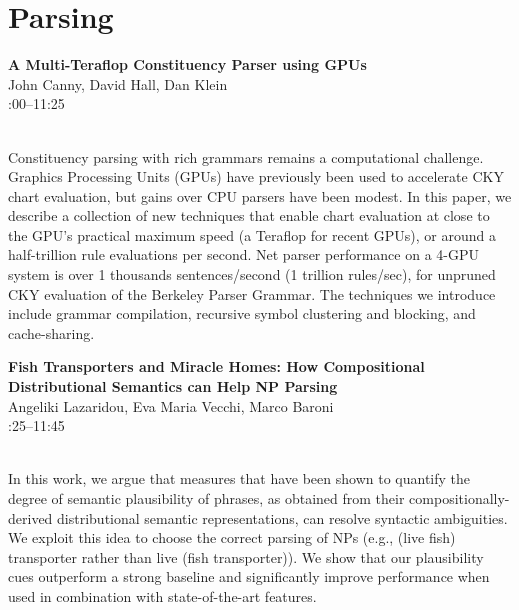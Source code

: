 \documentclass[twoside,makeidx]{book}
\renewcommand{\normalsize}{\fontsize{8}{9}\selectfont}
\renewcommand{\small}{\fontsize{7}{8}\selectfont}
\begin{document}
\section{Parsing}
\vspace{-1em}
\par\vspace{2em}\noindent%
\begin{minipage}{\linewidth}%
\begin{center}
\textbf{\normalsize A Multi-Teraflop Constituency Parser using GPUs}\\
\normalsize  John Canny,  David Hall,  Dan Klein\\
{\small 11:00--11:25}\\
\end{center}
\end{minipage}\\[0.5em]
\nopagebreak%
\noindent%
{\small Constituency parsing with rich grammars remains a computational challenge.  Graphics Processing Units (GPUs) have previously been used to accelerate CKY chart evaluation, but gains over CPU parsers have been modest. In this paper, we describe a collection of new techniques that enable chart evaluation at close to the GPU's practical maximum speed (a Teraflop for recent GPUs), or around a half-trillion rule evaluations per second. Net parser performance on a 4-GPU system is over 1 thousands sentences/second (1 trillion rules/sec), for unpruned CKY evaluation of the Berkeley Parser Grammar.                                               The techniques we introduce include grammar compilation, recursive symbol clustering and blocking, and cache-sharing.}
\par\vspace{2em}\noindent%
\begin{minipage}{\linewidth}%
\begin{center}
\textbf{\normalsize Fish Transporters and Miracle Homes: How Compositional Distributional Semantics can Help NP Parsing}\\
\normalsize  Angeliki Lazaridou,  Eva Maria Vecchi,  Marco Baroni\\
{\small 11:25--11:45}\\
\end{center}
\end{minipage}\\[0.5em]
\nopagebreak%
\noindent%
{\small In this work, we argue that measures that have been shown to quantify the degree of semantic plausibility of phrases, as obtained from their compositionally-derived distributional semantic representations,  can resolve syntactic ambiguities.  We exploit this idea to choose the correct parsing of NPs (e.g., (live fish) transporter  rather than live (fish transporter)).  We show that our plausibility cues outperform a strong baseline and significantly improve performance when used in combination with state-of-the-art features.}
\clearpage
\end{document}
